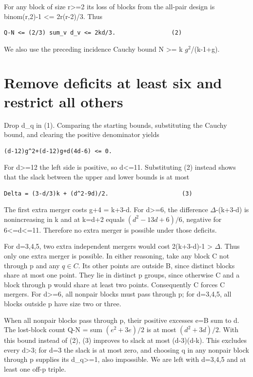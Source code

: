 \documentclass[11pt,letterpaper]{article}
\begin{document}
For any block of size r>=2 its loss of blocks from the all-pair design is
binom(r,2)-1 <= 2r(r-2)/3. Thus

\begin{verbatim}
Q-N <= (2/3) sum_v d_v <= 2kd/3.                (2)
\end{verbatim}

We also use the preceding incidence Cauchy bound N >= k \(g^2\)/(k-1+g).

\section{Remove deficits at least six and restrict all
others}\label{1-remove-deficits-at-least-six-and-restrict-all-others}

Drop d\_q in (1). Comparing the starting bounds, substituting the Cauchy
bound, and clearing the positive denominator yields

\begin{verbatim}
(d-12)g^2+(d-12)g+d(4d-6) <= 0.
\end{verbatim}

For d>=12 the left side is positive, so d<=11. Substituting (2) instead
shows that the slack between the upper and lower bounds is at most

\begin{verbatim}
Delta = (3-d/3)k + (d^2-9d)/2.                     (3)
\end{verbatim}

The first extra merger costs g+4 = k+3-d. For d>=6, the difference
\(\Delta\)-(k+3-d) is nonincreasing in k and at k=d+2 equals \((d^2-13d+6)/6\),
negative for 6<=d<=11. Therefore no extra merger is possible under those
deficits.

For d=3,4,5, two extra independent mergers would cost 2(k+3-d)-1
\textgreater{} \(\Delta\). Thus only one extra merger is possible. In either
reasoning, take any block C not through p and any \(q\in C\). Its other points
are outside B, since distinct blocks share at most one point. They lie
in distinct p groups, since otherwise C and a block through p would
share at least two points. Consequently C forces \textbar C
mergers. For d>=6, all nonpair blocks must pass through p; for d=3,4,5,
all blocks outside p have size two or three.

When all nonpair blocks pass through p, their positive excesses
e=\textbar B sum to d. The lost-block count Q-N = sum
\((e^2+3e)/2\) is at most \((d^2+3d)/2\). With this bound instead of (2), (3)
improves to slack at most (d-3)(d-k). This excludes every
d\textgreater3; for d=3 the slack is at most zero, and choosing q in any
nonpair block through p supplies its d\_q>=1, also impossible. We are
left with d=3,4,5 and at least one off-p triple.
\end{document}
